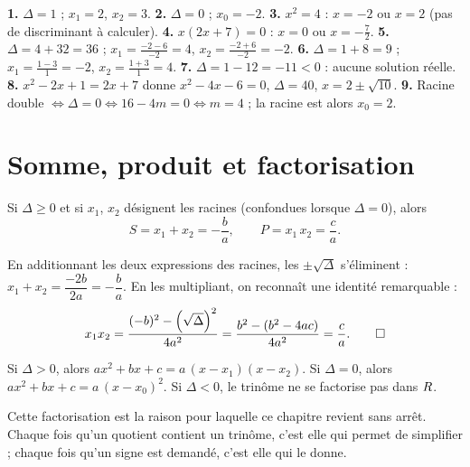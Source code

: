 \begin{corrige}
\textbf{1.} $\Delta = 1$ ; $x_{1} = 2$, $x_{2} = 3$.
\textbf{2.} $\Delta = 0$ ; $x_{0} = -2$.
\textbf{3.} $x^{2} = 4$ : $x = -2$ ou $x = 2$ (pas de discriminant à
calculer).
\textbf{4.} $x(2x+7) = 0$ : $x = 0$ ou $x = -\frac72$.
\textbf{5.} $\Delta = 4+32 = 36$ ; $x_{1} = \frac{-2-6}{-2} = 4$,
$x_{2} = \frac{-2+6}{-2} = -2$.
\textbf{6.} $\Delta = 1+8 = 9$ ; $x_{1} = \frac{1-3}{1} = -2$,
$x_{2} = \frac{1+3}{1} = 4$.
\textbf{7.} $\Delta = 1-12 = -11 < 0$ : aucune solution réelle.
\textbf{8.} $x^{2}-2x+1 = 2x+7$ donne $x^{2}-4x-6 = 0$, $\Delta = 40$,
$x = 2\pm\sqrt{10}$.
\textbf{9.} Racine double $\iff \Delta = 0 \iff 16-4m = 0 \iff m = 4$ ; la
racine est alors $x_{0} = 2$.
\end{corrige}

\section{Somme, produit et factorisation}

\begin{propriete}
Si $\Delta \geq 0$ et si $x_{1}$, $x_{2}$ désignent les racines (confondues
lorsque $\Delta = 0$), alors
\[
  S = x_{1}+x_{2} = -\frac{b}{a}, \qquad P = x_{1}\,x_{2} = \frac{c}{a}.
\]
\end{propriete}

\begin{demonstration}
En additionnant les deux expressions des racines, les $\pm\sqrt\Delta$
s'éliminent : $x_{1}+x_{2} = \dfrac{-2b}{2a} = -\dfrac ba$. En les
multipliant, on reconnaît une identité remarquable :
\[
  x_{1}x_{2} = \frac{(-b)^{2}-\left(\sqrt\Delta\right)^{2}}{4a^{2}}
  = \frac{b^{2}-(b^{2}-4ac)}{4a^{2}} = \frac{c}{a}. \qedhere
\]
\end{demonstration}

\begin{theoreme}
Si $\Delta > 0$, alors $ax^{2}+bx+c = a\,(x-x_{1})(x-x_{2})$.
Si $\Delta = 0$, alors $ax^{2}+bx+c = a\,(x-x_{0})^{2}$.
Si $\Delta < 0$, le trinôme ne se factorise pas dans $R$.
\end{theoreme}

\begin{remarque}
Cette factorisation est la raison pour laquelle ce chapitre revient sans
arrêt. Chaque fois qu'un quotient contient un trinôme, c'est elle qui permet
de simplifier ; chaque fois qu'un signe est demandé, c'est elle qui le donne.
\end{remarque}

